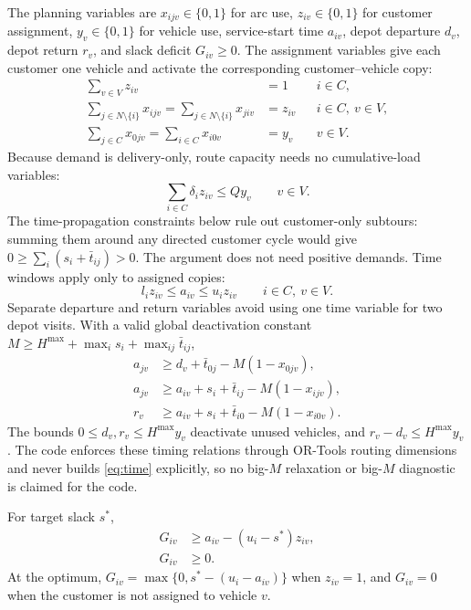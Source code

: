 \documentclass[11pt,a4paper]{article}
\begin{document}
The planning variables are $x_{ijv}\in\{0,1\}$ for arc use,
$z_{iv}\in\{0,1\}$ for customer assignment, $y_v\in\{0,1\}$ for vehicle use,
service-start time $a_{iv}$, depot departure $d_v$, depot return $r_v$, and
slack deficit $G_{iv}\geq0$. The assignment variables give each customer one
vehicle and activate the corresponding customer--vehicle copy:
\begin{align}
 \sum_{v\in V} z_{iv} &= 1 && i\in C, \\
 \sum_{j\in N\setminus\{i\}}x_{ijv}
   =\sum_{j\in N\setminus\{i\}}x_{jiv} &= z_{iv}
      && i\in C,\ v\in V, \\
 \sum_{j\in C}x_{0jv}=\sum_{i\in C}x_{i0v} &= y_v
      && v\in V.                                            \label{eq:flow}
\end{align}
Because demand is delivery-only, route capacity needs no cumulative-load
variables:
\begin{equation}
 \sum_{i\in C}\delta_i z_{iv}\leq Qy_v \qquad v\in V.       \label{eq:capacity}
\end{equation}
The time-propagation constraints below rule out customer-only subtours: summing
them around any directed customer cycle would give
$0\geq\sum_i(s_i+\bar t_{ij})>0$. The argument does not need positive demands.
Time windows apply only to assigned copies:
\begin{equation}
 l_i z_{iv}\leq a_{iv}\leq u_i z_{iv}
 \qquad i\in C,\ v\in V.                                   \label{eq:activate}
\end{equation}
Separate departure and return variables avoid using one time variable for two
depot visits. With a valid global deactivation constant
$M\geq H^{\max}+\max_i s_i+\max_{ij}\bar t_{ij}$,
\begin{align}
 a_{jv} &\geq d_v+\bar t_{0j}-M(1-x_{0jv}), \\
 a_{jv} &\geq a_{iv}+s_i+\bar t_{ij}-M(1-x_{ijv}), \\
 r_v &\geq a_{iv}+s_i+\bar t_{i0}-M(1-x_{i0v}).              \label{eq:time}
\end{align}
The bounds $0\leq d_v,r_v\leq H^{\max}y_v$ deactivate unused vehicles, and
$r_v-d_v\leq H^{\max}y_v$. The code enforces these timing relations through
OR-Tools routing dimensions and never builds \eqref{eq:time} explicitly, so no
big-$M$ relaxation or big-$M$ diagnostic is claimed for the code.

For target slack $s^*$,
\begin{align}
 G_{iv} &\geq a_{iv}-(u_i-s^*)z_{iv}, \\
 G_{iv} &\geq 0.                                            \label{eq:slack}
\end{align}
At the optimum, $G_{iv}=\max\{0,s^*-(u_i-a_{iv})\}$ when $z_{iv}=1$, and
$G_{iv}=0$ when the customer is not assigned to vehicle $v$.
\end{document}
